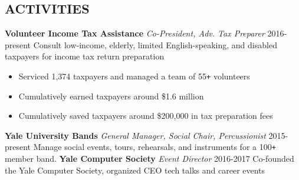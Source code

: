 \documentclass[margin, centered]{res}
\begin{document}
\begin{resume}
  \section{ACTIVITIES}
  \textbf{Volunteer Income Tax Assistance} \textit{Co-President, Adv. Tax Preparer} \hfill 2016-present \newline
  Consult low-income, elderly, limited English-speaking, and disabled taxpayers for income tax return preparation
  \begin{itemize}
    \item Serviced 1,374 taxpayers and managed a team of 55\texttt{+} volunteers
    \item Cumulatively earned taxpayers around \$1.6 million
    \item Cumulatively saved taxpayers around \$200,000 in tax preparation fees
    \end{itemize}
  \textbf{Yale University Bands} \textit{General Manager, Social Chair, Percussionist} \hfill 2015-present \newline
  Manage social events, tours, rehearsals, and instruments for a 100\texttt{+}  member band. 
  \smallskip \newline
  \textbf{Yale Computer Society} \textit{Event Director} \hfill 2016-2017 \newline
  Co-founded the Yale Computer Society, organized CEO tech talks and career events  

\end{resume}
\end{document}
